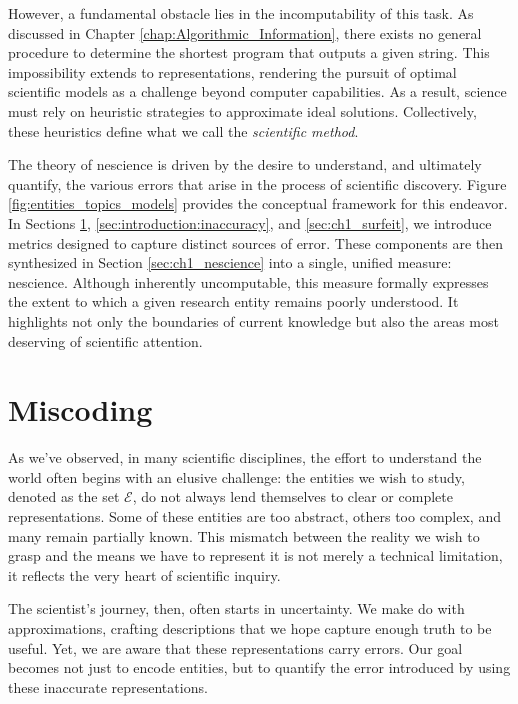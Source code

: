 However, a fundamental obstacle lies in the incomputability of this task. As discussed in Chapter \ref{chap:Algorithmic_Information}, there exists no general procedure to determine the shortest program that outputs a given string. This impossibility extends to representations, rendering the pursuit of optimal scientific models as a challenge beyond computer capabilities. As a result, science must rely on heuristic strategies to approximate ideal solutions. Collectively, these heuristics define what we call the \emph{scientific method}.

The theory of nescience is driven by the desire to understand, and ultimately quantify, the various errors that arise in the process of scientific discovery. Figure \ref{fig:entities_topics_models} provides the conceptual framework for this endeavor. In Sections \ref{sec:ch1_miscoding}, \ref{sec:introduction:inaccuracy}, and \ref{sec:ch1_surfeit}, we introduce metrics designed to capture distinct sources of error. These components are then synthesized in Section \ref{sec:ch1_nescience} into a single, unified measure: nescience. Although inherently uncomputable, this measure formally expresses the extent to which a given research entity remains poorly understood. It highlights not only the boundaries of current knowledge but also the areas most deserving of scientific attention.

%
%

\section{Miscoding}
\label{sec:ch1_miscoding}

As we've observed, in many scientific disciplines, the effort to understand the world often begins with an elusive challenge: the entities we wish to study, denoted as the set $\mathcal{E}$, do not always lend themselves to clear or complete representations. Some of these entities are too abstract, others too complex, and many remain partially known. This mismatch between the reality we wish to grasp and the means we have to represent it is not merely a technical limitation, it reflects the very heart of scientific inquiry.

The scientist's journey, then, often starts in uncertainty. We make do with approximations, crafting descriptions that we hope capture enough truth to be useful. Yet, we are aware that these representations carry errors. Our goal becomes not just to encode entities, but to quantify the error introduced by using these inaccurate representations.

